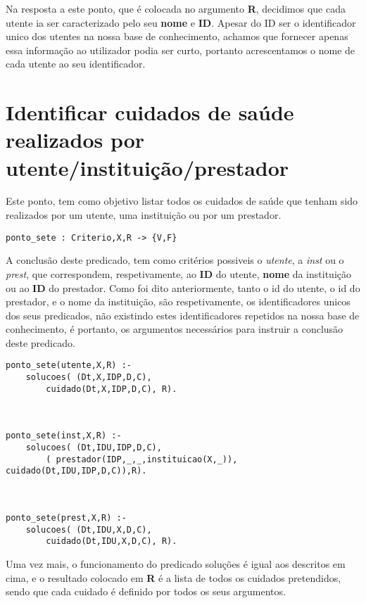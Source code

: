 \documentclass{report}
\def\titulo#1{\section{#1}}
\begin{document}
Na resposta a este ponto, que é colocada no argumento \textbf{R}, decidimos que cada utente ia ser caracterizado pelo seu \textbf{nome} e \textbf{ID}. Apesar do ID ser o identificador unico dos utentes na nossa base de conhecimento, achamos que fornecer apenas essa informação ao utilizador podia ser curto, portanto acrescentamos o nome de cada utente ao seu identificador.














\titulo{Identificar cuidados de saúde realizados por utente/instituição/prestador}

Este ponto, tem como objetivo listar todos os cuidados de saúde que tenham sido realizados por um utente, uma instituição ou por um prestador.

\begin{verbatim}
ponto_sete : Criterio,X,R -> {V,F}
\end{verbatim}

A conclusão deste predicado, tem como critérios possiveis o \textit{utente}, a \textit{inst} ou o \textit{prest}, que correspondem, respetivamente, ao \textbf{ID} do utente, \textbf{nome} da instituição ou ao \textbf{ID} do prestador. Como foi dito anteriormente, tanto o id do utente, o id do prestador, e o nome da instituição, são respetivamente, os identificadores unicos dos seus predicados, não existindo estes identificadores repetidos na nossa base de conhecimento, é portanto, os argumentos necessários para instruir a conclusão deste predicado.

\begin{verbatim}
ponto_sete(utente,X,R) :- 
    solucoes( (Dt,X,IDP,D,C), 
        cuidado(Dt,X,IDP,D,C), R).



ponto_sete(inst,X,R) :- 
    solucoes( (Dt,IDU,IDP,D,C), 
        ( prestador(IDP,_,_,instituicao(X,_)), cuidado(Dt,IDU,IDP,D,C)),R).



ponto_sete(prest,X,R) :- 
    solucoes( (Dt,IDU,X,D,C), 
        cuidado(Dt,IDU,X,D,C), R).
\end{verbatim}

Uma vez mais, o funcionamento do predicado soluções é igual aos descritos em cima, e o resultado colocado em \textbf{R} é a lista de todos os cuidados pretendidos, sendo que cada cuidado é definido por todos os seus argumentos.
\end{document}
